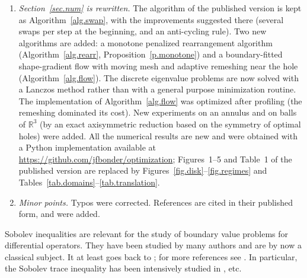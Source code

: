 \documentclass[11pt]{amsart}
\theoremstyle{remark}
\numberwithin{equation}{section}
\newcommand{\R}{\mathbb{R}}
\begin{document}
\begin{enumerate}
\item \emph{Section~\ref{sec.num} is rewritten.} The algorithm of the published version is kept as Algorithm~\ref{alg.swap}, with the improvements suggested there (several swaps per step at the beginning, and an anti-cycling rule). Two new algorithms are added: a monotone penalized rearrangement algorithm (Algorithm~\ref{alg.rearr}, Proposition~\ref{p.monotone}) and a boundary-fitted shape-gradient flow with moving mesh and adaptive remeshing near the hole (Algorithm~\ref{alg.flow}). The discrete eigenvalue problems are now solved with a Lanczos method rather than with a general purpose minimization routine. The implementation of Algorithm~\ref{alg.flow} was optimized after profiling (the remeshing dominated its cost). New experiments on an annulus and on balls of $\R^3$ (by an exact axisymmetric reduction based on the symmetry of optimal holes) were added. All the numerical results are new and were obtained with a Python implementation available at \url{https://github.com/jfbonder/optimization}; Figures~1--5 and Table~1 of the published version are replaced by Figures~\ref{fig.disk}--\ref{fig.regimes} and Tables~\ref{tab.domains}--\ref{tab.translation}.
\item \emph{Minor points.} Typos were corrected. References \cite{FBRW1,FBRW2,HP} are cited in their published form, and \cite{DP,Fl,KS,PS,Re} were added.
\end{enumerate}

\medskip

Sobolev inequalities are relevant for the study of boundary value problems for differential operators. They have been studied by many authors and are by now a classical subject. It at least goes back to \cite{Au}; for more references see \cite{DH}. In particular, the Sobolev trace inequality has been intensively studied in \cite{Bi,dPF,Es,FBLDR,FBR1,FBR2,LZ,MR}, etc.
\end{document}
